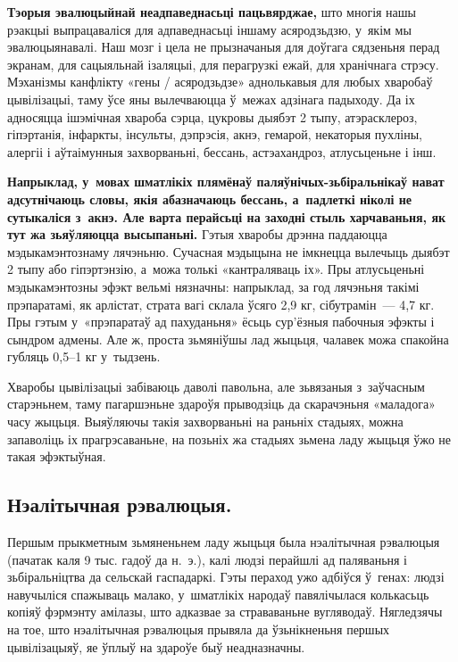 \textbf{Тэорыя эвалюцыйнай неадпаведнасьці пацьвярджае,} што многія нашы рэакцыі выпрацаваліся для адпаведнасьці іншаму асяродзьдзю, у~якім мы эвалюцыянавалі. Наш мозг і цела не прызначаныя для доўгага сядзеньня перад экранам, для сацыяльнай ізаляцыі, для перагрузкі ежай, для хранічнага стрэсу. Мэханізмы канфлікту «гены / асяродзьдзе» аднолькавыя для любых хваробаў цывілізацыі, таму ўсе яны вылечваюцца ў~межах адзінага падыходу. Да іх адносяцца ішэмічная хвароба сэрца, цукровы дыябэт 2 тыпу, атэрасклероз, гіпэртанія, інфаркты, інсульты, дэпрэсія, акнэ, гемарой, некаторыя пухліны, алергіі і аўтаімунныя захворваньні, бессань, астэахандроз, атлусьценьне і інш.


\textbf{Напрыклад, у~мовах шматлікіх плямёнаў паляўнічых-зьбіральнікаў нават адсутнічаюць словы, якія абазначаюць бессань, а~падлеткі ніколі не сутыкаліся з~акнэ. Але варта перайсьці на заходні стыль харчаваньня, як тут жа зьяўляюцца высыпаньні.} Гэтыя хваробы дрэнна паддаюцца мэдыкамэнтознаму лячэньню. Сучасная мэдыцына не імкнецца вылечыць дыябэт 2 тыпу або гіпэртэнзію, а~можа толькі «кантраляваць іх». Пры атлусьценьні мэдыкамэнтозны эфэкт вельмі нязначны: напрыклад, за год лячэньня такімі прэпаратамі, як арлістат, страта вагі склала ўсяго 2,9 кг, сібутрамін~--- 4,7 кг. Пры гэтым у~«прэпаратаў ад пахуданьня» ёсьць сур'ёзныя пабочныя эфэкты і сындром адмены. Але ж, проста зьмяніўшы лад жыцьця, чалавек можа спакойна губляць 0,5--1 кг у~тыдзень.

Хваробы цывілізацыі забіваюць даволі павольна, але зьвязаныя з~заўчасным старэньнем, таму пагаршэньне здароўя прыводзіць да скарачэньня «маладога» часу жыцьця. Выяўляючы такія захворваньні на раньніх стадыях, можна запаволіць іх прагрэсаваньне, на позьніх жа стадыях зьмена ладу жыцьця ўжо не такая эфэктыўная.

\subsection*{Нэалітычная рэвалюцыя.}

Першым прыкметным зьмяненьнем ладу жыцьця была нэалітычная рэвалюцыя (пачатак каля 9 тыс. гадоў да н.~э.), калі людзі перайшлі ад паляваньня і зьбіральніцтва да сельскай гаспадаркі. Гэты пераход ужо адбіўся ў~генах: людзі навучыліся спажываць малако, у~шматлікіх народаў павялічылася колькасьць копіяў фэрмэнту амілазы, што адказвае за страваваньне вугляводаў. Нягледзячы на тое, што нэалітычная рэвалюцыя прывяла да ўзьнікненьня першых цывілізацыяў, яе ўплыў на здароўе быў неадназначны.

